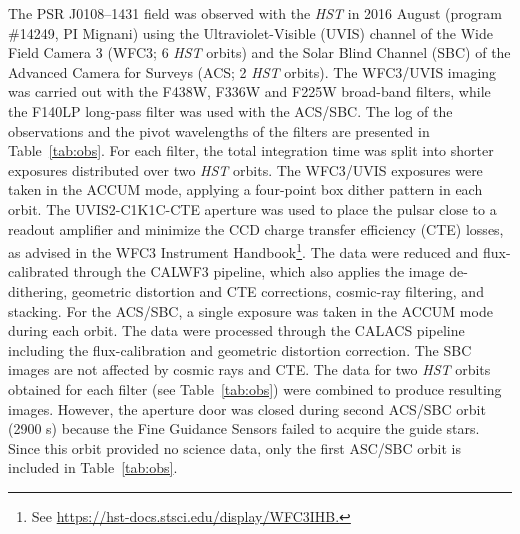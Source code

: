 \documentclass[pdftex,twocolumn]{aastex62}
\begin{document}
The PSR J0108--1431 field was observed with the {\sl HST} in 2016 August 
(program \#14249, PI Mignani) using the Ultraviolet-Visible (UVIS) channel of the Wide Field 
Camera 3 (WFC3; 6 {\sl HST} orbits) 
and the Solar Blind Channel (SBC) of the Advanced Camera for Surveys (ACS; 2 {\sl HST} orbits). 
The WFC3/UVIS imaging was carried out with the F438W, F336W and F225W broad-band filters,
while the F140LP long-pass filter was used with the ACS/SBC. 
The log of the observations and the pivot wavelengths of the filters are presented in 
Table~\ref{tab:obs}. 
For each filter, the total integration time  was split 
into shorter exposures distributed over two {\sl HST} 
orbits. 
The WFC3/UVIS exposures were taken in the ACCUM mode, applying a four-point box dither pattern 
in each orbit. 
The UVIS2-C1K1C-CTE aperture was used to place the
pulsar close to a readout amplifier and minimize the CCD charge
transfer efficiency (CTE) losses, as advised in the WFC3
Instrument Handbook\footnote{
See \url{https://hst-docs.stsci.edu/display/WFC3IHB.}}. The data were reduced
and flux-calibrated through the CALWF3 pipeline, which 
also applies the image de-dithering, geometric distortion and CTE corrections,
cosmic-ray filtering, and stacking. For the ACS/SBC,  a single exposure  was taken in the ACCUM 
mode during each orbit. 
The data were processed through the CALACS  pipeline  including the flux-calibration and  
geometric distortion correction. The SBC images are not affected by
cosmic rays and CTE. 
The data for two {\sl HST} orbits obtained for each filter (see Table~\ref{tab:obs}) 
were combined to produce resulting images. However, the aperture door was closed during second ACS/SBC orbit
(2900 s) 
because the Fine Guidance Sensors failed to acquire the guide stars.
Since this orbit provided no science data,
only the first ASC/SBC orbit is included in Table~\ref{tab:obs}.  
  
\end{document}
